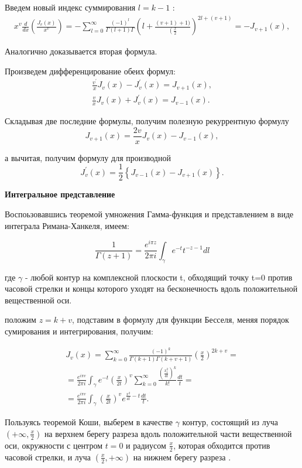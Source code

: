 Введем новый индекс суммирования $l=k-1$ :
\[
\begin{aligned}
	x^{v} \frac{d}{d x}\left(\frac{J_{v}(x)}{x^{v}}\right)=-\sum_{l=0}^{\infty} \frac{(-1)^{l}}{\Gamma(l+1) \Gamma}\left(l+\frac{(v+1)+1)}{\left(\frac{x}{2}\right.}\right)^{2 l+(v+1)}= -J_{v+1}(x),
\end{aligned}
\]

Аналогично доказывается вторая формула.

Произведем дифференцирование обеих формул:
\[
\begin{aligned}
	\frac{v^{\prime}}{x} J_{v}(x)-J_{v}^{\prime}(x)=J_{v+1}(x), \\
	\frac{v}{x} J_{v}(x)+J_{v}^{\prime}(x)=J_{v-1}(x) .
\end{aligned}
\]

Складывая две последние формулы, получим полезную рекуррентную формулу
\[
J_{v+1}(x)=\frac{2 v}{x} J_{v}(x)-J_{v-1}(x),
\]

а вычитая, получим формулу для производной
\[
J_{v}^{\prime}(x)=\frac{1}{2}\left\{J_{v-1}(x)-J_{v+1}(x)\right\} .
\]

\textbf{Интегральное представление}

Воспоьзовавшись теоремой умножения Гамма-функция и представлением в виде интеграла Римана-Ханкеля, имеем:

\[
\frac{1}{\Gamma(z+1)} = \frac{e^{i\pi z}}{2 \pi i}\int_{\gamma} e^{-t} t^{-z-1}dl
\]

где $\gamma$ - любой контур на комплексной плоскости t, обходящий точку t=0 против часовой стрелки и концы которого уходят на бесконечность вдоль положительной вещественной оси.

положим $z = k + v$, подставим в формулу для функции Бесселя, меняя порядок сумирования и интегрирования, получим:

\[
\begin{aligned}
	J_{v}(x)=\sum_{k=0}^{\infty} \frac{(-1)^{k}}{\Gamma(k+1) \Gamma(k+v+1)}\left(\frac{x}{2}\right)^{2 k+v}= \\
	=\frac{e^{i \pi v}}{2 \pi i} \int_{\gamma} e^{-t}\left(\frac{x}{2 t}\right)^{v} \sum_{k=0}^{\infty} \frac{\left(\frac{x_{1}^{2}}{4 t}\right)^{k}}{k !} \frac{d t}{t}= \\
	=\frac{e^{i \pi v}}{2 \pi i} \int_{\gamma}\left(\frac{x}{2 t}\right)^{v} e^{\frac{x^{2}}{4 t}-t} \frac{d t}{t} .
\end{aligned}
\]

Пользуясь теоремой Коши, выберем в качестве $\gamma$ контур, состоящий из луча $\left(+\infty, \frac{x}{2}\right)$ на верхнем берегу разреза вдоль положительной части вещественной оси, окружности с центром $t=0$ и радиусом $\frac{x}{2}$, которая обходится против часовой стрелки, и луча $\left(\frac{x}{2},+\infty\right)$ на нижнем берегу разреза .


